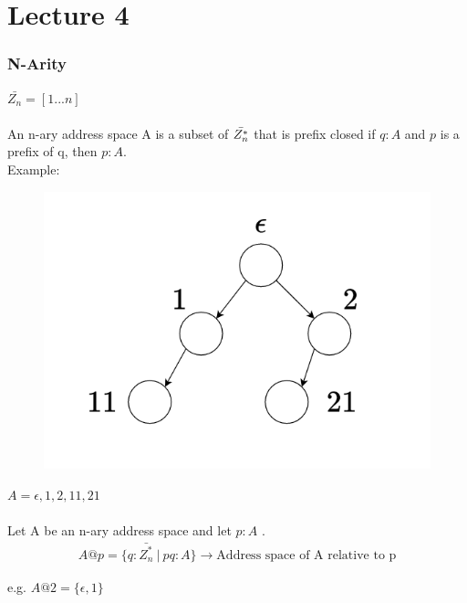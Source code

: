 \chapter{Lecture 4}

\subsection{N-Arity}
$\bar{Z_{n}} = [1...n]$

\subsubsection{}An n-ary address space A is a subset of $\Bar{Z^{*}_{n}}$ that is prefix closed if $q: A$ and $p$ is a prefix of q, then $p: A$.\\

Example:
\begin{figure}[htbp]
    \center
    \includegraphics[scale=0.8]{images/popl-4-1.png}
    \caption{}
\end{figure}

$A = {\epsilon, 1, 2, 11, 21}$
\subsubsection{}
Let A be an n-ary address space and let $p:A$ .
\begin{gather}
    A@p = \{q: \bar{Z_{n}^{*}}\  \vert\  pq: A\}  \xrightarrow{} \text{Address space of A relative to p}
\end{gather}

e.g.
\indent $A@2 = \{\epsilon, 1\}$

